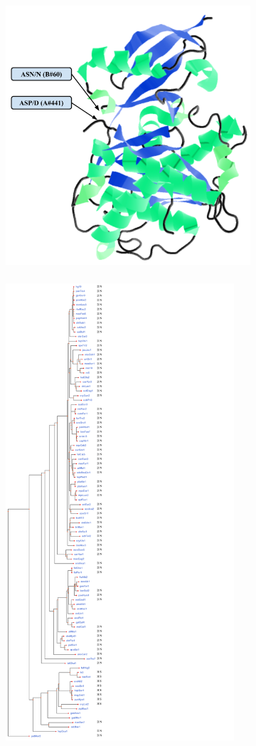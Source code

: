 \begin{figure}[p]
\begin{subfigure}[t]{0.7\textwidth}
  \centering
  \includegraphics[height=10cm]{figs/gwas_figure_4_jmol.png}
  \label{fig:sub1}
\end{subfigure}
\begin{subfigure}[t]{.2\textwidth}
  \centering
  \includegraphics[height=17cm]{figs/gwas_figure_4_tree_coevolution.png}

\end{subfigure}
\end{figure}
